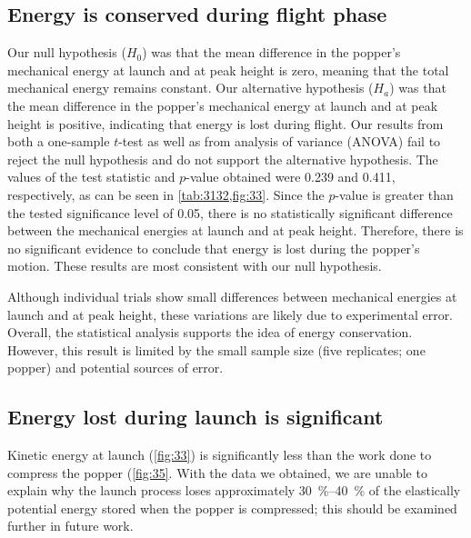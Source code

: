 \documentclass[reprint,amsmath,amssymb,aps,twoside]{revtex4-2} %
\begin{document}
\subsection{Energy is conserved during flight phase}
Our null hypothesis ($H_0$) was that the mean difference in the popper’s mechanical energy at launch and at peak height is zero, meaning that the total mechanical energy remains constant. Our alternative hypothesis ($H_a$) was that the mean difference in the popper’s mechanical energy at launch and at peak height is positive, indicating that energy is lost during flight. Our results from both a one-sample $t$-test as well as from analysis of variance (ANOVA) fail to reject the null hypothesis and do not support the alternative hypothesis.  The values of the test statistic and $p$-value obtained were 0.239 and 0.411, respectively, as can be seen in \cref{tab:3132,fig:33}. Since the $p$-value is greater than the tested significance level of 0.05, there is no statistically significant difference between the mechanical energies at launch and at peak height. Therefore, there is no significant evidence to conclude that energy is lost during the popper’s motion. These results are most consistent with our null hypothesis. 

Although individual trials show small differences between mechanical energies at launch and at peak height, these variations are likely due to experimental error. Overall, the statistical analysis supports the idea of energy conservation. However, this result is limited by the small sample size (five replicates; one popper) and potential sources of error.


\subsection{Energy lost during launch is significant}
Kinetic energy at launch (\cref{fig:33}) is significantly less than the work done to compress the popper (\cref{fig:35}. With the data we obtained, we are unable to explain why the launch process loses approximately \qtyrange{30}{40}{\percent} of the elastically potential energy stored when the popper is compressed; this should be examined further in future work.
\end{document}
